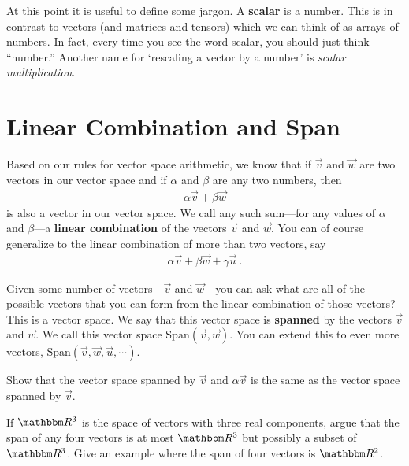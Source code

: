 \documentclass[12pt, oneside]{report}    %
\let\oldsection\section
\def\section{%
  \setcounter{sidenote}{1}%
  \oldsection
}
\begin{document}
At this point it is useful to define some jargon. A \textbf{scalar} is a number. This is in contrast to vectors (and matrices and tensors) which we can think of as arrays of numbers. In fact, every time you see the word scalar, you should just think ``number.'' Another name for `rescaling a vector by a number' is \emph{scalar multiplication}.

\section{Linear Combination and Span}
\label{sec:linear:combination:and:span}

Based on our rules for vector space arithmetic, we know that if $\vec{v}$ and $\vec{w}$ are two vectors in our vector space and if $\alpha$ and $\beta$ are any two numbers, then
\begin{align}
    \alpha\vec{v} + \beta\vec{w} 
\end{align}
is also a vector in our vector space. We call any such sum---for any values of $\alpha$ and $\beta$---a \textbf{linear combination} of the vectors $\vec{v}$ and $\vec{w}$. You can of course generalize to the linear combination of more than two vectors, say
\begin{align}
    \alpha\vec{v} + \beta\vec{w} + \gamma\vec{u} \ .
\end{align}

Given some number of vectors---$\vec{v}$ and $\vec{w}$---you can ask what are all of the possible vectors that you can form from the linear combination of those vectors? This is a vector space. We say that this vector space is \textbf{spanned} by the vectors $\vec{v}$ and $\vec{w}$. We call this vector space $\text{Span}(\vec{v},\vec{w})$. You can extend this to even more vectors, $\text{Span}(\vec{v}, \vec{w}, \vec{u},\cdots)$.

\begin{exercise}
Show that the vector space spanned by $\vec{v}$ and $\alpha\vec{v}$ is the same as the vector space spanned by $\vec{v}$.
\end{exercise}

\begin{exercise}
If $\RR ^3$ is the space of vectors with three real components, argue that the span of any four vectors is at most $\RR ^3$ but possibly a subset of $\RR ^3$. Give an example where the span of four vectors is $\RR ^2$. 
\end{exercise}
\end{document}
